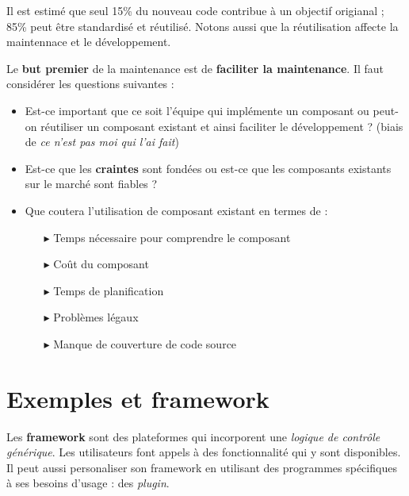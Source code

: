 \documentclass[16pt]{report}
\begin{document}
\begin{multicols*}{2}
        \begin{note}{}{}
            Il est estimé que seul 15\% du nouveau code contribue à un objectif origianal ; 
            85\% peut être standardisé et réutilisé. Notons aussi que la réutilisation affecte 
            la maintennace et le développement. 
        \end{note}

        Le \textbf{but premier} de la maintenance est de \textbf{faciliter la maintenance}. Il faut considérer 
        les questions suivantes :
        \begin{itemize}
            \item Est-ce important que ce soit l'équipe qui implémente un composant ou peut-on réutiliser 
                un composant existant et ainsi faciliter le développement ? (biais de \textit{ce n'est pas moi qui 
                l'ai fait})
            \item Est-ce que les \textbf{craintes} sont fondées ou est-ce que les composants existants sur 
                le marché sont fiables ?
            \item Que coutera l'utilisation de composant existant en termes de : 
                \begin{itemize}
                    \item[$\blacktriangleright$] Temps nécessaire pour comprendre le composant 
                    \item[$\blacktriangleright$] Coût du composant 
                    \item[$\blacktriangleright$] Temps de planification 
                    \item[$\blacktriangleright$] Problèmes légaux 
                    \item[$\blacktriangleright$] Manque de couverture de code source
                \end{itemize}
        \end{itemize}

        \section{Exemples et framework}

        \begin{Definitionx}{}{}
            Les \textbf{framework} sont des plateformes qui incorporent une \textit{logique de contrôle générique}. 
            Les utilisateurs font appels à des fonctionnalité qui y sont disponibles. Il peut aussi 
            personaliser son framework en utilisant des programmes spécifiques à ses besoins d'usage : des
            \textit{plugin}.
        \end{Definitionx}


\end{multicols*}
\end{document}
